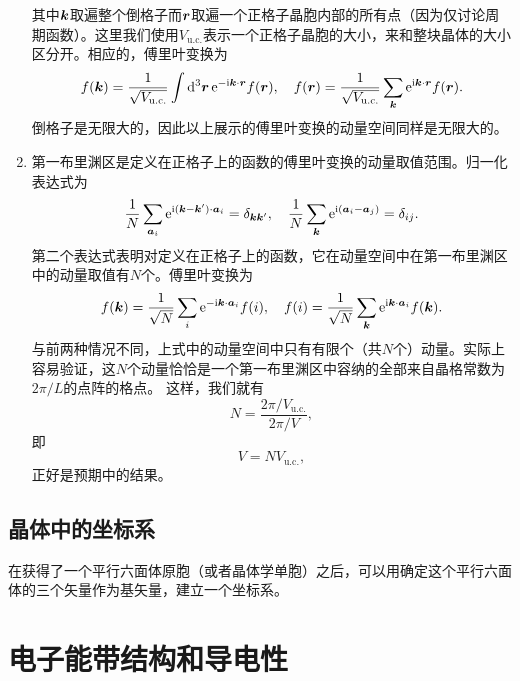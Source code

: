 \documentclass[hyperref, UTF8, a4paper]{ctexart}
\newcommand*{\ii}{\mathrm{i}}
\newcommand*{\ee}{\mathrm{e}}
\begin{document}
\begin{enumerate}
    其中$\vb*{k}$取遍整个倒格子而$\vb*{r}$取遍一个正格子晶胞内部的所有点（因为仅讨论周期函数）。这里我们使用$V_\text{u.c.}$表示一个正格子晶胞的大小，来和整块晶体的大小区分开。相应的，傅里叶变换为
    \begin{equation}
        f(\vb*{k}) = \frac{1}{\sqrt{V_\text{u.c.}}} \int \dd[3]{\vb*{r}} \ee^{- \ii \vb*{k} \cdot \vb*{r}} f(\vb*{r}), \quad f(\vb*{r}) = \frac{1}{\sqrt{V_\text{u.c.}}} \sum_{\vb*{k}} \ee^{\ii \vb*{k} \cdot \vb*{r}} f(\vb*{r}).
    \end{equation}
    倒格子是无限大的，因此以上展示的傅里叶变换的动量空间同样是无限大的。
    \item 第一布里渊区是定义在正格子上的函数的傅里叶变换的动量取值范围。归一化表达式为
    \begin{equation}
        \frac{1}{N} \sum_{\vb*{a}_i} \ee^{\ii (\vb*{k} - \vb*{k}') \cdot \vb*{a}_i} = \delta_{\vb*{k} \vb*{k}'}, \quad \frac{1}{N} \sum_{\vb*{k}} \ee^{\ii (\vb*{a}_i - \vb*{a}_j)} = \delta_{ij}.
    \end{equation}
    第二个表达式表明对定义在正格子上的函数，它在动量空间中在第一布里渊区中的动量取值有$N$个。傅里叶变换为
    \begin{equation}
        f(\vb*{k}) = \frac{1}{\sqrt{N}} \sum_{i} \ee^{- \ii \vb*{k} \cdot \vb*{a}_i} f(i), \quad f(i) = \frac{1}{\sqrt{N}} \sum_{\vb*{k}} \ee^{\ii \vb*{k} \cdot \vb*{a}_i} f(\vb*{k}).
    \end{equation}
    与前两种情况不同，上式中的动量空间中只有有限个（共$N$个）动量。实际上容易验证，这$N$个动量恰恰是一个第一布里渊区中容纳的全部来自晶格常数为$2\pi / L$的点阵的格点。
    这样，我们就有
    \[
        N = \frac{2\pi / V_\text{u.c.}}{2\pi / V},
    \]
    即
    \begin{equation}
        V = N V_\text{u.c.},
    \end{equation}
    正好是预期中的结果。
\end{enumerate}

\subsection{晶体中的坐标系}


在获得了一个平行六面体原胞（或者晶体学单胞）之后，可以用确定这个平行六面体的三个矢量作为基矢量，建立一个坐标系。

\section{电子能带结构和导电性}
\end{document}
